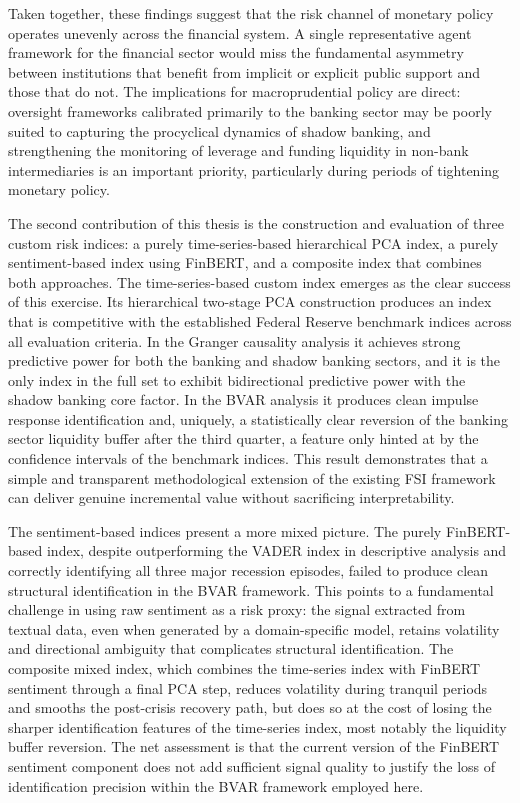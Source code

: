 \documentclass[12pt,a4paper]{report}\usepackage[a4paper, top=2.5cm, bottom=2.5cm, left=2.5cm, right=2.5cm]{geometry}
\begin{document}
Taken together, these findings suggest that the risk channel of monetary policy
operates unevenly across the financial system. A single representative agent
framework for the financial sector would miss the fundamental asymmetry between
institutions that benefit from implicit or explicit public support and those that
do not. The implications for macroprudential policy are direct: oversight frameworks
calibrated primarily to the banking sector may be poorly suited to capturing the
procyclical dynamics of shadow banking, and strengthening the monitoring of leverage
and funding liquidity in non-bank intermediaries is an important priority, particularly
during periods of tightening monetary policy.

The second contribution of this thesis is the construction and evaluation of three
custom risk indices: a purely time-series-based hierarchical PCA index, a purely
sentiment-based index using FinBERT, and a composite index that combines both
approaches. The time-series-based custom index emerges as the clear success of this
exercise. Its hierarchical two-stage PCA construction produces an index that is
competitive with the established Federal Reserve benchmark indices across all
evaluation criteria. In the Granger causality analysis it achieves strong predictive
power for both the banking and shadow banking sectors, and it is the only index in
the full set to exhibit bidirectional predictive power with the shadow banking core
factor. In the BVAR analysis it produces clean impulse response identification and,
uniquely, a statistically clear reversion of the banking sector liquidity buffer after
the third quarter, a feature only hinted at by the confidence intervals of the
benchmark indices. This result demonstrates that a simple and transparent
methodological extension of the existing FSI framework can deliver genuine
incremental value without sacrificing interpretability.

The sentiment-based indices present a more mixed picture. The purely FinBERT-based
index, despite outperforming the VADER index in descriptive analysis and correctly
identifying all three major recession episodes, failed to produce clean structural
identification in the BVAR framework. This points to a fundamental challenge in
using raw sentiment as a risk proxy: the signal extracted from textual data, even
when generated by a domain-specific model, retains volatility and directional
ambiguity that complicates structural identification. The composite mixed index,
which combines the time-series index with FinBERT sentiment through a final PCA
step, reduces volatility during tranquil periods and smooths the post-crisis recovery
path, but does so at the cost of losing the sharper identification features of the
time-series index, most notably the liquidity buffer reversion. The net assessment
is that the current version of the FinBERT sentiment component does not add
sufficient signal quality to justify the loss of identification precision within
the BVAR framework employed here.
\end{document}
